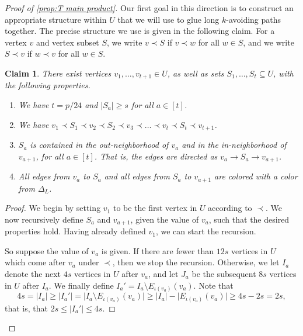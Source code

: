 \documentclass[10pt,a4paper]{amsart}
\newtheorem{claim}{Claim}
\newcommand\ab[1]{\lvert#1\rvert}
\begin{document}
\begin{proof}[Proof of \cref{prop:T main product}]
    Our first goal in this direction is to construct an appropriate structure within $U$ that we will use to glue long $k$-avoiding paths together. The precise structure we use is given in the following claim. For a vertex $v$ and vertex subset $S$, we write $v \prec S$ if $v \prec w$ for all $w \in S$, and we write $S \prec v$ if $w \prec v$ for all $w \in S$. 
    \begin{claim}\label{claim:gluing structure}
        There exist vertices $v_1,\dots,v_{t+1} \in U$, as well as sets $S_1,\dots,S_{t}\subseteq U$, with the following properties.
        \begin{enumerate}[label=(\roman*)]
            \item We have $t=p/24$ and $\ab{S_a}\geq s$ for all $a \in [t]$.\label{it:sizes}
            \item We have $v_1 \prec S_1 \prec v_2 \prec S_2 \prec v_3 \prec \dots \prec v_{t} \prec S_{t}\prec v_{t+1}$.\label{it:order}
            \item $S_a$ is contained in the out-neighborhood of $v_a$ and in the in-neighborhood of $v_{a+1}$, for all $a \in [t]$. That is, the edges are directed as $v_a \to S_a \to v_{a+1}$. \label{it:direction}
            \item All edges from $v_a$ to $S_a$ and all edges from $S_a$ to $v_{a+1}$ are colored with a color from $\Delta_L$.\label{it:color}
        \end{enumerate}
    \end{claim}
    \begin{proof}
        We begin by setting $v_1$ to be the first vertex in $U$ according to $\prec$. We now recursively define $S_a$ and $v_{a+1}$, given the value of $v_a$, such that the desired properties hold. Having already defined $v_1$, we can start the recursion.

        So suppose the value of $v_a$ is given. If there are fewer than $12s$ vertices in $U$ which come after $v_a$ under $\prec$, then we stop the recursion. Otherwise, we let $I_a$ denote the next $4s$ vertices in $U$ after $v_a$, and let $J_a$ be the subsequent $8s$ vertices in $U$ after $I_a$. We finally define $I_a' = I_a \setminus E_{\iota(v_a)}(v_a)$. 
        Note that 
        \[
            4s = \ab{I_a} \geq \ab{I_a'} = \ab{I_a \setminus E_{\iota(v_a)}(v_a)} \geq \ab{I_a} - \ab{E_{\iota(v_a)}(v_a)} \geq 4s - 2s = 2s,
        \]
        that is, that $2s \leq \ab{I_a'} \leq 4s$.


\end{proof}
\end{proof}
\end{document}
